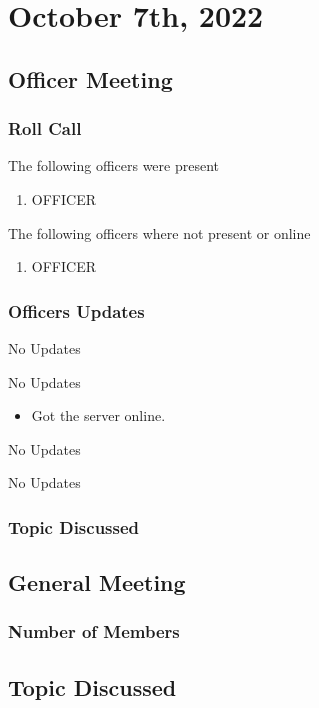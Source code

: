 \section{October 7th, 2022}
\subsection{Officer Meeting}

\subsubsection{Roll Call}
The following officers were present

\begin{enumerate}
\item OFFICER
\end{enumerate}

The following officers where not present or online

\begin{enumerate}
    \item OFFICER
\end{enumerate}

\subsubsection{Officers Updates}

\textbf{\president}

No Updates

\textbf{\vicepresident}

No Updates

\textbf{\tresurer}

\begin{itemize}
    \item Got the server online.
\end{itemize}

\textbf{\primaryprogrammer}

No Updates

\textbf{\secretary}

No Updates

\subsubsection{Topic Discussed}

\subsection{General Meeting}
\subsubsection{Number of Members}
\subsection{Topic Discussed}